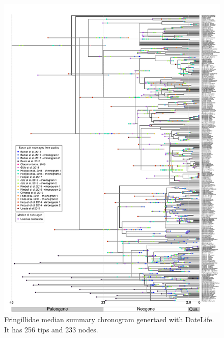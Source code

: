 \begin{figure}[!h]
\includegraphics{../figures/figure-fringillidae/median_and_calibration_ages_simple.png}
\caption{Fringillidae median summary chronogram genertaed with DateLife. It has 256 tips and 233 nodes.}
\label{fig:fringillidages}
\end{figure}


